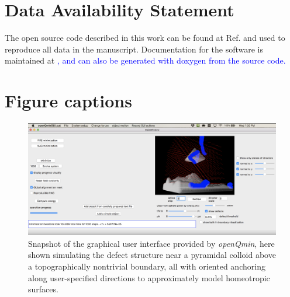 \documentclass[utf8]{frontiersFPHY} %
\newcommand{\DMS}[1]{\textcolor{blue}{#1}}
\def\PackageName{\textit{openQmin}}
\begin{document}
\section*{Data Availability Statement}
The open source code described in this work can be found at Ref. \citep{landauDeGUI} and used to reproduce all data in the manuscript. Documentation for the software is maintained at \citep{landauDeGUIdocumentation}\DMS{, and can also be generated with doxygen from the source code.}




\section*{Figure captions}


\begin{figure}[h!]
\begin{center}
\includegraphics[width=15cm]{Fig1GUI.jpg}
\end{center}
\caption{Snapshot of the graphical user interface provided by \PackageName, here shown simulating the defect structure near a pyramidal colloid above a topographically nontrivial boundary, all with oriented anchoring along user-specified directions to approximately model homeotropic surfaces.}\label{fig:gui}
\end{figure}
\end{document}
